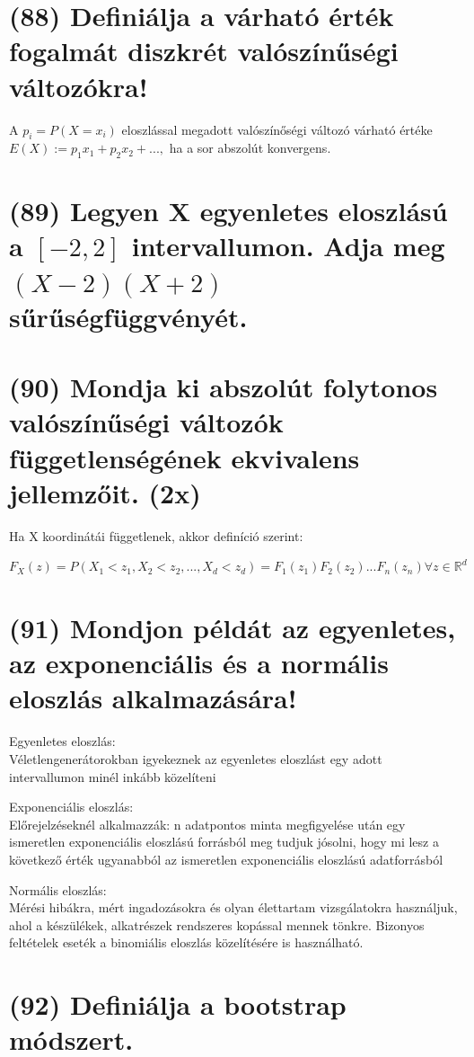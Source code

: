 \documentclass[12p]{article}
\begin{document}
\section{(88) Definiálja a várható érték fogalmát diszkrét valószínűségi változókra!}

A $p_i =P (X=x_i)$ eloszlással megadott valószínőségi változó várható értéke $E(X):= p_1x_1+ p_2x_2 +...,$ ha a sor abszolút konvergens.

\section{(89)  Legyen X egyenletes eloszlású a $[-2,2]$ intervallumon. Adja meg $(X - 2)(X + 2)$ sűrűségfüggvényét.}

\section{(90) Mondja ki abszolút folytonos valószínűségi változók függetlenségének ekvivalens jellemzőit. (2x)}

Ha X koordinátái függetlenek, akkor definíció szerint:

$F_X(z) = P(X_1<z_1, X_2<z_2, ..., X_d<z_d) = F_1(z_1)F_2(z_2)...F_n(z_n) \forall z \in \mathbb{R}^d$

\section{(91) Mondjon példát az egyenletes, az exponenciális és a normális eloszlás alkalmazására!}

Egyenletes eloszlás:\\
Véletlengenerátorokban igyekeznek az egyenletes eloszlást egy adott intervallumon minél inkább közelíteni

Exponenciális eloszlás:\\
Előrejelzéseknél alkalmazzák: n adatpontos minta megfigyelése után egy ismeretlen exponenciális eloszlású forrásból meg tudjuk jósolni, hogy mi lesz a következő érték ugyanabból az ismeretlen exponenciális eloszlású adatforrásból

Normális eloszlás:\\
Mérési hibákra, mért ingadozásokra és olyan élettartam vizsgálatokra használjuk, ahol a készülékek, alkatrészek rendszeres kopással mennek tönkre. Bizonyos feltételek eseték a binomiális eloszlás közelítésére is használható.

\section{(92) Definiálja a bootstrap módszert.}
\end{document}
